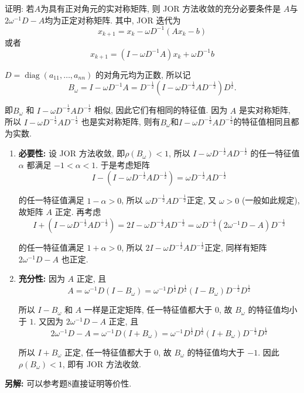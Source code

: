 \documentclass[12pt, answers]{exam}     %
\newcommand{\anothersolution}{\par\noindent\textbf{另解:}}
\begin{document}
\begin{questions}
\question{}证明: 若\(A\)为具有正对角元的实对称矩阵, 则 JOR 方法收敛的充分必要条件是 \(A\)与\(2\omega^{-1}D-A\)均为正定对称矩阵. 
其中, JOR 迭代为\[ x_{k+1} = x_k - \omega D^{-1} (Ax_k - b) \]
或者
\[ x_{k+1} = (I - \omega D^{-1} A)x_k + \omega D^{-1} b \]
\begin{solution}
$D = \operatorname{diag}(a_{11}, \ldots, a_{nn})$ 的对角元均为正数, 所以记
\[
B_{\omega} = I - \omega D^{-1}A = D^{-\frac{1}{2}}(I - \omega D^{-\frac{1}{2}}AD^{-\frac{1}{2}})D^{\frac{1}{2}}. 
\]

即$B_{\omega}$ 和 $I - \omega D^{-\frac{1}{2}}AD^{-\frac{1}{2}}$ 相似, 因此它们有相同的特征值. 因为 $A$ 是实对称矩阵, 所以 $I - \omega D^{-\frac{1}{2}}AD^{-\frac{1}{2}}$ 也是实对称矩阵, 
则有\(B_{\omega}\)和\(I - \omega D^{-\frac{1}{2}}AD^{-\frac{1}{2}}\)的特征值相同且都为实数. 

\begin{enumerate}
\item \textbf{必要性:}
设 JOR 方法收敛, 即$\rho(B_{\omega}) < 1$, 所以 $I - \omega D^{-\frac{1}{2}}AD^{-\frac{1}{2}}$ 的任一特征值 $\alpha$ 都满足 $-1 < \alpha < 1$. 
于是考虑矩阵
\[
I - (I - \omega D^{-\frac{1}{2}}AD^{-\frac{1}{2}}) = \omega D^{-\frac{1}{2}}AD^{-\frac{1}{2}}
\]

的任一特征值满足 $1 - \alpha > 0$, 所以 $\omega D^{-\frac{1}{2}}AD^{-\frac{1}{2}}$正定, 
又 $ \omega > 0 $ (一般如此规定), 故矩阵 $A$ 正定. 再考虑
\[
I + (I - \omega D^{-\frac{1}{2}}AD^{-\frac{1}{2}}) = 2I - \omega D^{-\frac{1}{2}}AD^{-\frac{1}{2}} = \omega D^{-\frac{1}{2}}(2\omega^{-1}D - A)D^{-\frac{1}{2}}
\]

的任一特征值满足 $1 + \alpha > 0$, 所以 $2I - \omega D^{-\frac{1}{2}}AD^{-\frac{1}{2}}$正定, 
同样有矩阵 $2\omega^{-1}D - A$ 也正定. 

\item \textbf{充分性:}
因为 $A$ 正定, 且
\[
A = \omega^{-1}D(I - B_{\omega}) = \omega^{-1} D^{\frac{1}{2}} D^{\frac{1}{2}}(I - B_{\omega} )D^{-\frac{1}{2}}D^{\frac{1}{2}}  
\]

所以 $I - B_{\omega}$ 和 $A$ 一样是正定矩阵, 任一特征值都大于 $0$, 故 $B_{\omega}$ 的特征值均小于 $1$. 又因为 $2\omega^{-1}D - A$ 正定, 且
\[
2\omega^{-1}D - A = \omega^{-1}D(I + B_{\omega}) = \omega^{-1} D^{\frac{1}{2}} D^{\frac{1}{2}}(I + B_{\omega} )D^{-\frac{1}{2}}D^{\frac{1}{2}}    
\]

所以 $I + B_{\omega}$ 正定, 任一特征值都大于 $0$, 故 $B_{\omega}$ 的特征值均大于 $-1$. 因此 $\rho(B_{\omega}) < 1$, 即有 JOR 方法收敛. 
\end{enumerate}
\anothersolution{}
可以参考题8直接证明等价性.
\end{solution}


\end{questions}
\end{document}
